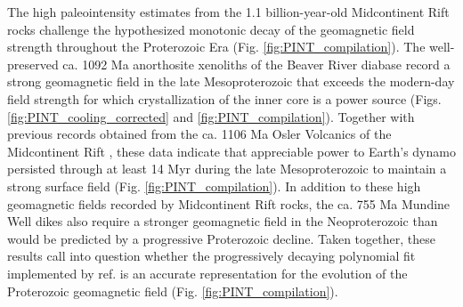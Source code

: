 \documentclass[9pt,twocolumn,twoside,lineno]{pnas-new}
\begin{document}
The high paleointensity estimates from the 1.1 billion-year-old Midcontinent Rift rocks challenge the hypothesized monotonic decay of the geomagnetic field strength throughout the Proterozoic Era (Fig. \ref{fig:PINT_compilation}). The well-preserved ca. 1092 Ma anorthosite xenoliths of the Beaver River diabase record a strong geomagnetic field in the late Mesoproterozoic that exceeds the modern-day field strength for which crystallization of the inner core is a power source (Figs. \ref{fig:PINT_cooling_corrected} and \ref{fig:PINT_compilation}). Together with previous records obtained from the ca. 1106 Ma Osler Volcanics of the Midcontinent Rift \cite{Sprain2018a}, these data indicate that appreciable power to Earth's dynamo persisted through at least 14 Myr during the late Mesoproterozoic to maintain a strong surface field (Fig. \ref{fig:PINT_compilation}). In addition to these high geomagnetic fields recorded by Midcontinent Rift rocks, the ca. 755 Ma Mundine Well dikes \cite{Lloyd2021b} also require a stronger geomagnetic field in the Neoproterozoic than would be predicted by a progressive Proterozoic decline. Taken together, these results call into question whether the progressively decaying polynomial fit implemented by ref. \cite{Bono2019a} is an accurate representation for the evolution of the Proterozoic geomagnetic field (Fig. \ref{fig:PINT_compilation}). 
\end{document}
